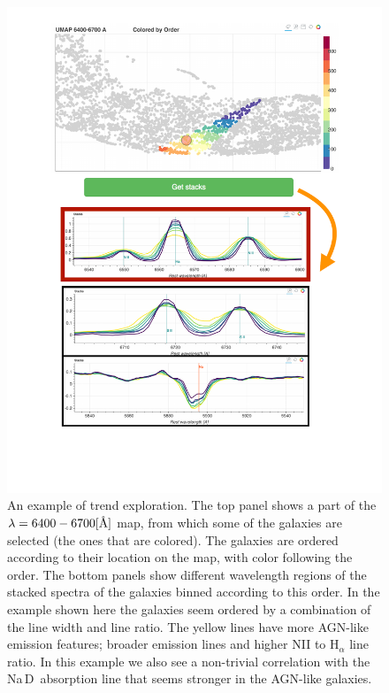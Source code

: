 \documentclass[fleqn,usenatbib]{mnras}
\newcommand{\angstrom}{\mbox{\normalfont\AA}}
\def\nad{\mbox{Na\hspace{.5pt}{I}\,D}}
\begin{document}
{\begin{figure}
  \begin{center}
  \includegraphics[width=\columnwidth]{stack_full_fig}
  \caption{An example of trend exploration. The top panel shows a part of the $\lambda = 6400 - 6700 [\angstrom]$  map, from which some of the galaxies are selected  (the ones that are colored). The galaxies are ordered according to their location on the map, with color following the order. The bottom panels show different wavelength regions of the stacked spectra of the galaxies binned according to this order. In the example shown here the galaxies seem ordered by a combination of the line width and line ratio. The yellow lines have more AGN-like emission features; broader emission lines and higher  NII to H$_{\alpha}$ line ratio. In this example  we also  see a non-trivial correlation with the \nad\ absorption line that seems stronger in the AGN-like galaxies.}\label{fig:stacks}
  \end{center}
\end{figure}




}
\end{document}

